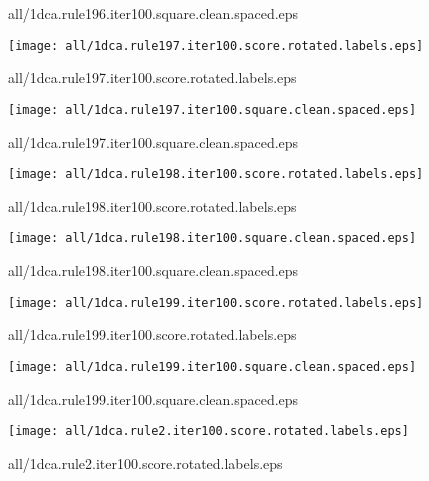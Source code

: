 \documentclass{article}
\begin{document}
{\footnotesize all/1dca.rule196.iter100.square.clean.spaced.eps}
\begin{center}
\begin{minipage}{\textwidth}
\texttt{[image: all/1dca.rule197.iter100.score.rotated.labels.eps]}
\end{minipage}
\end{center}
{\footnotesize all/1dca.rule197.iter100.score.rotated.labels.eps}
\begin{center}
\begin{minipage}{\textwidth}
\texttt{[image: all/1dca.rule197.iter100.square.clean.spaced.eps]}
\end{minipage}
\end{center}
{\footnotesize all/1dca.rule197.iter100.square.clean.spaced.eps}
\begin{center}
\begin{minipage}{\textwidth}
\texttt{[image: all/1dca.rule198.iter100.score.rotated.labels.eps]}
\end{minipage}
\end{center}
{\footnotesize all/1dca.rule198.iter100.score.rotated.labels.eps}
\begin{center}
\begin{minipage}{\textwidth}
\texttt{[image: all/1dca.rule198.iter100.square.clean.spaced.eps]}
\end{minipage}
\end{center}
{\footnotesize all/1dca.rule198.iter100.square.clean.spaced.eps}
\begin{center}
\begin{minipage}{\textwidth}
\texttt{[image: all/1dca.rule199.iter100.score.rotated.labels.eps]}
\end{minipage}
\end{center}
{\footnotesize all/1dca.rule199.iter100.score.rotated.labels.eps}
\begin{center}
\begin{minipage}{\textwidth}
\texttt{[image: all/1dca.rule199.iter100.square.clean.spaced.eps]}
\end{minipage}
\end{center}
{\footnotesize all/1dca.rule199.iter100.square.clean.spaced.eps}
\begin{center}
\begin{minipage}{\textwidth}
\texttt{[image: all/1dca.rule2.iter100.score.rotated.labels.eps]}
\end{minipage}
\end{center}
{\footnotesize all/1dca.rule2.iter100.score.rotated.labels.eps}
\end{document}

